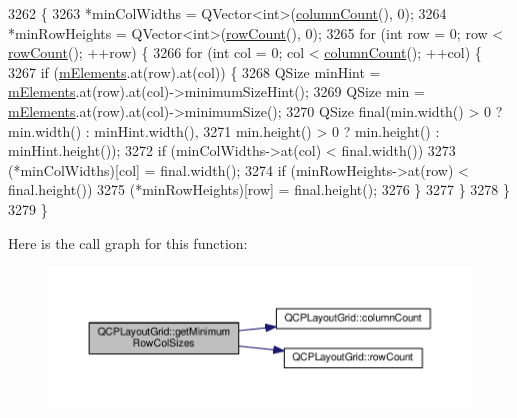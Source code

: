 \begin{DoxyCode}
3262                                                                              \{
3263   *minColWidths = QVector<int>(\hyperlink{class_q_c_p_layout_grid_ac39074eafd148b82d0762090f258189e}{columnCount}(), 0);
3264   *minRowHeights = QVector<int>(\hyperlink{class_q_c_p_layout_grid_af8e6c7a05864ebe610c87756c7b9079c}{rowCount}(), 0);
3265   \textcolor{keywordflow}{for} (\textcolor{keywordtype}{int} row = 0; row < \hyperlink{class_q_c_p_layout_grid_af8e6c7a05864ebe610c87756c7b9079c}{rowCount}(); ++row) \{
3266     \textcolor{keywordflow}{for} (\textcolor{keywordtype}{int} col = 0; col < \hyperlink{class_q_c_p_layout_grid_ac39074eafd148b82d0762090f258189e}{columnCount}(); ++col) \{
3267       \textcolor{keywordflow}{if} (\hyperlink{class_q_c_p_layout_grid_a2ec4664bcfb5d479255e50f0c074f7c9}{mElements}.at(row).at(col)) \{
3268         QSize minHint = \hyperlink{class_q_c_p_layout_grid_a2ec4664bcfb5d479255e50f0c074f7c9}{mElements}.at(row).at(col)->minimumSizeHint();
3269         QSize min = \hyperlink{class_q_c_p_layout_grid_a2ec4664bcfb5d479255e50f0c074f7c9}{mElements}.at(row).at(col)->minimumSize();
3270         QSize \textcolor{keyword}{final}(min.width() > 0 ? min.width() : minHint.width(),
3271                     min.height() > 0 ? min.height() : minHint.height());
3272         \textcolor{keywordflow}{if} (minColWidths->at(col) < \textcolor{keyword}{final}.width())
3273           (*minColWidths)[col] = \textcolor{keyword}{final}.width();
3274         \textcolor{keywordflow}{if} (minRowHeights->at(row) < \textcolor{keyword}{final}.height())
3275           (*minRowHeights)[row] = \textcolor{keyword}{final}.height();
3276       \}
3277     \}
3278   \}
3279 \}
\end{DoxyCode}


Here is the call graph for this function\+:\nopagebreak
\begin{figure}[H]
\begin{center}
\leavevmode
\includegraphics[width=350pt]{class_q_c_p_layout_grid_ac645fb9b1c4257b08a9f09dee10b9b3f_cgraph}
\end{center}
\end{figure}




